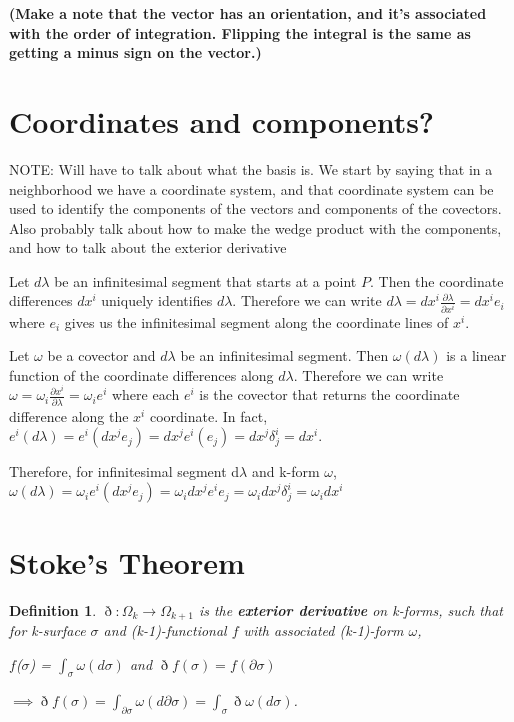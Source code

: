 \documentclass{book}
\newtheorem{defn}[equation]{Definition}
\begin{document}
\textbf{(Make a note that the vector has an orientation, and it's associated with the order of integration. Flipping the integral is the same as getting a minus sign on the vector.)}

\section{Coordinates and components?} 

NOTE: Will have to talk about what the basis is. We start by saying that in a neighborhood we have a coordinate system, and that coordinate system can be used to identify the components of the vectors and components of the covectors. Also probably talk about how to make the wedge product with the components, and how to talk about the exterior derivative

Let $d\lambda$ be an infinitesimal segment that starts at a point $P$. Then the coordinate differences $dx^i$ uniquely identifies $d\lambda$. Therefore we can write $d\lambda = dx^i \frac{\partial \lambda}{\partial x^i} = dx^i e_i$ where $e_i$ gives us the infinitesimal segment along the coordinate lines of $x^i$.

Let $\omega$ be a covector and $d\lambda$ be an infinitesimal segment. Then $\omega(d\lambda)$ is a linear function of the coordinate differences along $d\lambda$. Therefore we can write $\omega = \omega_i \frac{\partial x^i}{\partial \lambda} = \omega_i e^i$ where each $e^i$ is the covector that returns the coordinate difference along the $x^i$ coordinate. In fact, $e^i(d\lambda) = e^i(dx^j e_j) = dx^j e^i(e_j) = dx^j \delta^i_j = dx^i$.


Therefore, for infinitesimal segment d$\lambda$ and k-form $\omega$, $\omega(d\lambda) = \omega_ie^i(dx^je_j) = \omega_idx^je^ie_j = \omega_idx^j\delta^i_j = \omega_i dx^i$ 

\section{Stoke's Theorem}



\begin{defn}
	$\eth : \Omega_k \to \Omega_{k+1}$ is the \textbf{exterior derivative} on k-forms, such that for k-surface $\sigma$ and (k-1)-functional $f$ with associated (k-1)-form $\omega$, 
	
	$f$($\sigma$) = $\int_{\sigma}\omega(d\sigma)$ and $\eth f(\sigma) = f(\partial\sigma)$
	
	$\implies \eth f(\sigma) = \int_{\partial\sigma} \omega(d\partial\sigma) = \int_{\sigma} \eth\omega(d\sigma)$. 
\end{defn}
\end{document}
